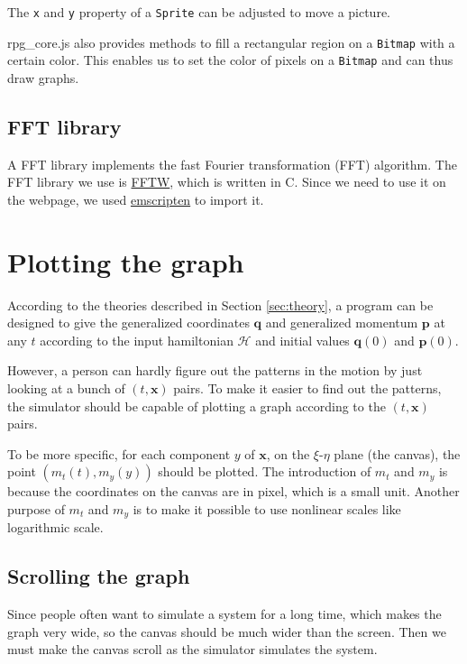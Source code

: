 \documentclass[12pt]{article}
\begin{document}
The \texttt{x} and \texttt{y} property of a \texttt{Sprite} can be adjusted to move a picture.

rpg\_core.js also provides methods to fill a rectangular region on a \texttt{Bitmap}
with a certain color.
This enables us to set the color of pixels on a \texttt{Bitmap} and can thus draw graphs.

\subsection{FFT library}
\label{sec:fft}

A FFT library implements the fast Fourier transformation (FFT) algorithm.
The FFT library we use is \href{http://www.fftw.org}{FFTW}, which is written in C.
Since we need to use it on the webpage,
we used \href{https://emscripten.org}{emscripten} to import it.

\section{Plotting the graph}

According to the theories described in Section \ref{sec:theory},
a program can be designed to give
the generalized coordinates $\mathbf q$ and generalized momentum $\mathbf p$ at any $t$
according to the input hamiltonian $\mathcal H$
and initial values $\mathbf q\!\left(0\right)$ and $\mathbf p\!\left(0\right)$.

However, a person can hardly figure out the patterns in the motion
by just looking at a bunch of $\left(t,\mathbf x\right)$ pairs.
To make it easier to find out the patterns,
the simulator should be capable of plotting a graph
according to the $\left(t,\mathbf x\right)$ pairs.

To be more specific, for each component $y$ of $\mathbf x$,
on the $\xi$-$\eta$ plane (the canvas),
the point $\left(m_t\!\left(t\right),m_y\!\left(y\right)\right)$ should be plotted.
The introduction of $m_t$ and $m_y$ is because the coordinates on the canvas
are in pixel, which is a small unit.
Another purpose of $m_t$ and $m_y$ is to make it possible to use nonlinear
scales like logarithmic scale.

\subsection{Scrolling the graph}

Since people often want to simulate a system for a long time,
which makes the graph very wide,
so the canvas should be much wider than the screen.
Then we must make the canvas scroll as the simulator simulates the system.
\end{document}
